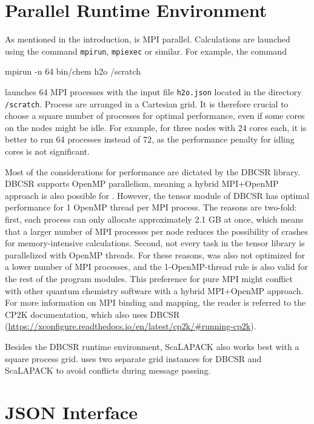 \section{Parallel Runtime Environment}

As mentioned in the introduction, \mchem{} is MPI parallel. Calculations are launched using the command \texttt{mpirun}, \texttt{mpiexec} or similar. For example, the command
\begin{code}
mpirun -n 64 bin/chem h2o /scratch
\end{code}
\noindent launches 64 MPI processes with the input file \texttt{h2o.json} located in the directory \texttt{/scratch}. Process are arranged in a Cartesian grid. It is therefore crucial to choose a square number of processes for optimal performance, even if some cores on the nodes might be idle. For example, for three nodes with 24 cores each, it is better to run 64 processes instead of 72, as the performance penalty for idling cores is not significant. 

Most of the considerations for performance are dictated by the DBCSR library. DBCSR supports OpenMP parallelism, meaning a hybrid MPI+OpenMP approach is also possible for \mchem{}. However, the tensor module of DBCSR has optimal performance for 1 OpenMP thread per MPI process. The reasons are two-fold: first, each process can only allocate approximately 2.1 GB at once, which means that a larger number of MPI processes per node reduces the possibility of crashes for memory-intensive calculations. Second, not every task in the tensor library is parallelized with OpenMP threads. For these reasons, \mchem{} was also not optimized for a lower number of MPI processes, and the 1-OpenMP-thread rule is also valid for the rest of the program modules. This preference for pure MPI might conflict with other quantum chemistry software with a hybrid MPI+OpenMP approach. For more information on MPI binding and mapping, the reader is referred to the CP2K documentation, which also uses DBCSR (\url{https://xconfigure.readthedocs.io/en/latest/cp2k/#running-cp2k}).

Besides the DBCSR runtime environment, ScaLAPACK also works best with a square process grid. \mchem{} uses two separate grid instances for DBCSR and ScaLAPACK to avoid conflicts during message passing.

\section{JSON Interface \label{sec:JSON}}

